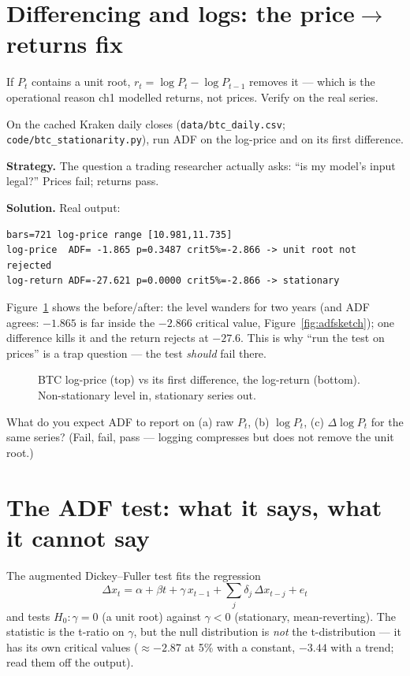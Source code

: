 \section{Differencing and logs: the price\texorpdfstring{$\to$}{->}returns fix}\label{sec:diff}
If $P_t$ contains a unit root, $r_t=\log P_t-\log P_{t-1}$ removes
it --- which is the operational reason ch1 modelled returns, not
prices. Verify on the real series.

\begin{example}
\label{ex:btcadf}
On the cached Kraken daily closes (\texttt{data/btc\_daily.csv};
\texttt{code/btc\_stationarity.py}), run ADF on the log-price and on
its first difference.

\textbf{Strategy.} The question a trading researcher actually asks:
``is my model's input legal?'' Prices fail; returns pass.

\textbf{Solution.} Real output:
\begin{lstlisting}[numbers=none]
bars=721 log-price range [10.981,11.735]
log-price  ADF= -1.865 p=0.3487 crit5%=-2.866 -> unit root not rejected
log-return ADF=-27.621 p=0.0000 crit5%=-2.866 -> stationary
\end{lstlisting}
Figure~\ref{fig:diff} shows the before/after: the level wanders for
two years (and ADF agrees: $-1.865$ is far inside the $-2.866$
critical value, Figure~\ref{fig:adfsketch}); one difference kills it
and the return rejects at $-27.6$. This is why ``run the test on
prices'' is a trap question --- the test \emph{should} fail there.
\end{example}

\begin{figure}[ht]\centering

\caption{BTC log-price (top) vs its first difference, the log-return
(bottom). Non-stationary level in, stationary series out.}
\label{fig:diff}
\end{figure}

\begin{checkpoint}
What do you expect ADF to report on (a) raw $P_t$, (b) $\log P_t$,
(c) $\Delta\log P_t$ for the same series? (Fail, fail, pass ---
logging compresses but does not remove the unit root.)
\end{checkpoint}

\section{The ADF test: what it says, what it cannot say}\label{sec:adf}
The augmented Dickey--Fuller test fits the regression
\[
\Delta x_t = \alpha + \beta t + \gamma\, x_{t-1}
  + \textstyle\sum_{j}\delta_j\,\Delta x_{t-j} + e_t
\]
and tests $H_0:\gamma=0$ (a unit root) against $\gamma<0$
(stationary, mean-reverting). The statistic is the t-ratio on
$\gamma$, but the null distribution is \emph{not} the t-distribution
--- it has its own critical values ($\approx-2.87$ at 5\% with a
constant, $-3.44$ with a trend; read them off the output).

